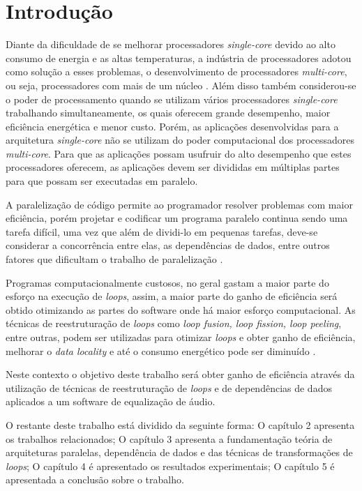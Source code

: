 \chapter{Introdução}

Diante da  dificuldade de se melhorar processadores \textit{single-core} devido 
ao alto consumo de energia e as altas temperaturas, a indústria de processadores 
adotou como solução a esses problemas, o desenvolvimento de processadores 
\textit{multi-core}, ou seja, processadores com mais de um núcleo \cite{aapc}. 
Além disso também considerou-se o poder de processamento 
quando se utilizam vários processadores \textit{single-core} trabalhando 
simultaneamente, os quais oferecem grande desempenho, maior eficiência energética 
e menor custo.
Porém, as aplicações desenvolvidas para a arquitetura \textit{single-core} não 
se utilizam do poder computacional dos processadores \textit{multi-core}.
Para que as aplicações possam usufruir do alto desempenho que estes processadores 
oferecem, as aplicações devem ser divididas em múltiplas partes para que possam 
ser executadas em paralelo.

A paralelização de código permite ao programador resolver problemas com maior 
eficiência, porém projetar e codificar um programa paralelo continua sendo uma 
tarefa difícil, uma vez que além de dividi-lo em pequenas tarefas, deve-se 
considerar a concorrência entre elas, as dependências de dados, entre outros 
fatores que dificultam o trabalho de paralelização \cite{aipp}.

Programas computacionalmente custosos, no geral gastam a maior parte do esforço 
na execução de \textit{loops}, assim, a maior parte do ganho de eficiência será
obtido otimizando as partes do software onde há maior esforço computacional.
As técnicas de reestruturação de \textit{loops} como \textit{loop 
fusion, loop fission, loop peeling}, entre outras, podem ser utilizadas para
otimizar \textit{loops} e obter ganho de eficiência, melhorar o \textit{data
locality} e até o consumo energético pode ser diminuído \cite{Liu:2004}.

Neste contexto o objetivo deste trabalho será obter ganho de eficiência através da 
utilização de técnicas de reestruturação de \textit{loops} e de dependências de 
dados aplicados a um software de equalização de áudio.

O restante deste trabalho está dividido da seguinte forma: O capítulo 2
  apresenta os trabalhos relacionados; O capítulo 3
  apresenta a fundamentação teória de arquiteturas paralelas, dependência de
  dados e das técnicas de transformações de \textit{loops}; O capítulo 4 é  
  apresentado os resultados experimentais; O capítulo 5 é apresentada a 
  conclusão sobre o trabalho.
